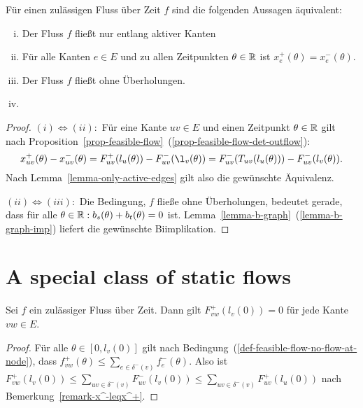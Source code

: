 \begin{theorem}\label{thm-equivalencies-nash-flow}
	Für einen zulässigen Fluss über Zeit $f$ sind die folgenden Aussagen äquivalent:
	\begin{enumerate}[(i)]
		\item Der Fluss $f$ fließt nur entlang aktiver Kanten
		\item Für alle Kanten $e\in E$ und zu allen Zeitpunkten $\theta\in\mathbb{R}$ ist $x_e^+(\theta) = x_e^-(\theta)$.
		\item Der Fluss $f$ fließt ohne Überholungen.
		\item {}
	\end{enumerate}
\end{theorem}
\begin{proof}
	$(i) \Leftrightarrow (ii):$ Für eine Kante $uv\in E$ und einen Zeitpunkt $\theta\in\mathbb{R}$ gilt nach Proposition~\ref{prop-feasible-flow}~(\ref{prop-feasible-flow-det-outflow}):
	$$x_{uv}^+(\theta) - x_{uv}^-(\theta) = F_{uv}^+(l_u(\theta)) - F_{uv}^-(\l_v(\theta)) = F_{uv}^-(T_{uv}(l_u(\theta))) - F_{uv}^-(l_v(\theta)).$$
	Nach Lemma~\ref{lemma-only-active-edges} gilt also die gewünschte Äquivalenz.
	
	$(ii) \Leftrightarrow (iii):$ Die Bedingung, $f$ fließe ohne Überholungen, bedeutet gerade, dass für alle $\theta\in\mathbb{R}: b_s(\theta) + b_t(\theta) = 0$ ist.
	Lemma~\ref{lemma-b-graph}~(\ref{lemma-b-graph-imp}) liefert die gewünschte Biimplikation.
\end{proof}

\section{A special class of static flows}

\begin{lemma}\label{lemma-no-inflow-until-l}
	Sei $f$ ein zulässiger Fluss über Zeit.
	Dann gilt $F_{vw}^+(l_v(0)) = 0$ für jede Kante $vw\in E$.
\end{lemma}
\begin{proof}
	Für alle $\theta\in [0, l_v(0)]$ gilt nach Bedingung~(\ref{def-feasible-flow-no-flow-at-node}), dass $f_{vw}^+(\theta) \leq \sum_{e\in\delta^-(v)} f_e^-(\theta)$.
	Also ist $F_{vw}^+(l_v(0)) \leq \sum_{uv\in\delta^-(v)} F_{uv}^-(l_v(0))\leq \sum_{uv\in\delta^-(v)} F_{uv}^+(l_u(0))$ nach Bemerkung~\ref{remark-x^-leqx^+}.
\end{proof}

